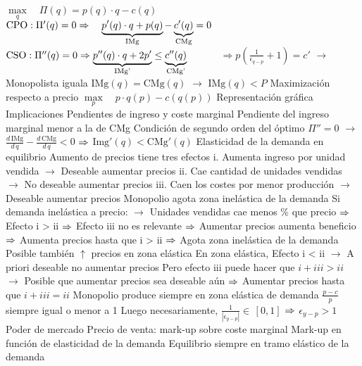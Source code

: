 \documentclass{nuevotema}
\begin{document}
\begin{esquemal}
				\4[] $\underset{q}{\max} \quad \Pi(q) = p(q) \cdot q - c(q)$
				\4[] $\text{CPO}: \Pi'(q) =0 \Rightarrow \quad \underbrace{p'(q) \cdot q + p(q)}_{\text{IMg}} - \underbrace{c'(q)}_{\text{CMg}} = 0$
				\4[] $\text{CSO}: \Pi''(q) = 0 \Rightarrow \underbrace{p''(q) \cdot q + 2 p'}_{\text{IMg'}} \leq \underbrace{c''(q)}_{\text{CMg'}}$
				\4[] $\quad \quad \quad \Rightarrow p \left( \frac{1}{\epsilon_{q-p}} + 1 \right) = c'$
				\4[] $\to$ Monopolista iguala $\text{IMg}(q) = \text{CMg}(q)$
				\4[] $\to$ $\text{IMg}(q) < P$
			\3 Maximización respecto a precio
				\4[] $\underset{p}{\max} \quad p \cdot q(p) - c\left( q(p) \right)$
			\3 Representación gráfica
				\4[] 
		\2 Implicaciones
			\3 Pendientes de ingreso y coste marginal
				\4 Pendiente del ingreso marginal menor a la de CMg
				\4 Condición de segundo orden del óptimo
				\4[] $\Pi''=0$
				\4[] $\to$ $\frac{d \, \text{IMg}}{d \, q} - \frac{d \, \text{CMg}}{d \, q} < 0$
				\4[] $\then$ $\text{Img}'(q) < \text{CMg}'(q)$
			\3 Elasticidad de la demanda en equilibrio
				\4 Aumento de precios tiene tres efectos
				\4[] i. Aumenta ingreso por unidad vendida
				\4[] $\to$ Deseable aumentar precios
				\4[] ii. Cae cantidad de unidades vendidas
				\4[] $\to$ No deseable aumentar precios
				\4[] iii. Caen los costes por menor producción
				\4[] $\to$ Deseable aumentar precios
				\4 Monopolio agota zona inelástica de la demanda
				\4[] Si demanda inelástica a precio:
				\4[] $\to$ Unidades vendidas cae menos \% que precio
				\4[] $\then$ Efecto i > ii
				\4[] $\then$ Efecto iii no es relevante
				\4[] $\then$ Aumentar precios aumenta beneficio
				\4[] $\then$ Aumenta precios hasta que i > ii
				\4[] $\then$ Agota zona inelástica de la demanda
				\4 Posible también $\uparrow$ precios en zona elástica
				\4[] En zona elástica, Efecto i < ii
				\4[] $\to$ A priori deseable no aumentar precios
				\4[] Pero efecto iii puede hacer que $i + iii > ii$
				\4[] $\to$ Posible que aumentar precios sea deseable aún
				\4[] $\then$ Aumentar precios hasta que $i + iii = ii$
				\4[$\then$] Monopolio produce siempre en zona elástica de demanda
				\4[$\then$] $\frac{p-c}{p}$ siempre igual o menor a 1
				\4[] Luego necesariamente, $\frac{1}{\left| \epsilon_{y-p} \right|} \in \, \left[ 0, 1 \right]$
				\4[] $\then$ $\epsilon_{y-p} > 1$
			\3 Poder de mercado
				\4 Precio de venta: mark-up sobre coste marginal
				\4 Mark-up en función de elasticidad de la demanda
				\4[$\to$] 
				\4 Equilibrio siempre en tramo elástico de la demanda

\end{esquemal}
\end{document}
